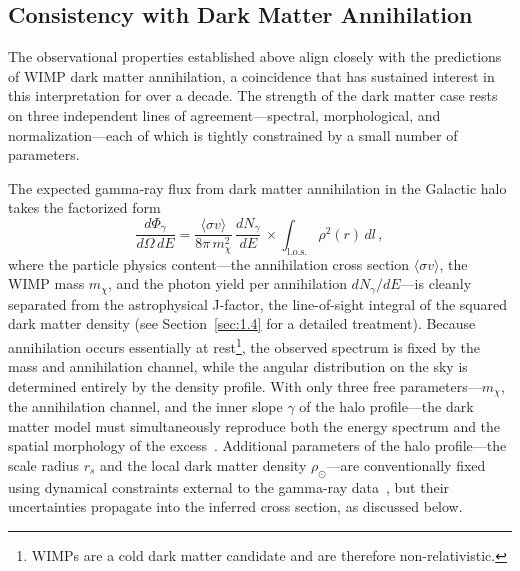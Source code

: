 \subsection{Consistency with Dark Matter Annihilation}
\label{sec:4.1.4}

The observational properties established above align closely with the predictions of WIMP dark matter annihilation, a coincidence that has sustained interest in this interpretation for over a decade.
The strength of the dark matter case rests on three independent lines of agreement---spectral, morphological, and normalization---each of which is tightly constrained by a small number of parameters.

The expected gamma-ray flux from dark matter annihilation in the Galactic halo takes the factorized form
\begin{equation}
	\frac{d\Phi_\gamma}{d\Omega\, dE} = \frac{\langle \sigma v \rangle}{8\pi\, m_\chi^2}\, \frac{dN_\gamma}{dE}\, \times \int_{\mathrm{l.o.s.}} \rho^2(r)\, dl\,,
	\label{eq:dm_flux_gce}
\end{equation}
where the particle physics content---the annihilation cross section $\langle \sigma v \rangle$, the WIMP mass $m_\chi$, and the photon yield per annihilation $dN_\gamma/dE$---is cleanly separated from the astrophysical J-factor, the line-of-sight integral of the squared dark matter density (see Section~\ref{sec:1.4} for a detailed treatment).
Because annihilation occurs essentially at rest\footnote{WIMPs are a cold dark matter candidate and are therefore non-relativistic.}, the observed spectrum is fixed by the mass and annihilation channel, while the angular distribution on the sky is determined entirely by the density profile.
With only three free parameters---$m_\chi$, the annihilation channel, and the inner slope $\gamma$ of the halo profile---the dark matter model must simultaneously reproduce both the energy spectrum and the spatial morphology of the excess~\cite{Daylan:2014rsa}.
Additional parameters of the halo profile---the scale radius $r_s$ and the local dark matter density $\rho_\odot$---are conventionally fixed using dynamical constraints external to the gamma-ray data~\cite{Abazajian:2014fta,Daylan:2014rsa}, but their uncertainties propagate into the inferred cross section, as discussed below.

